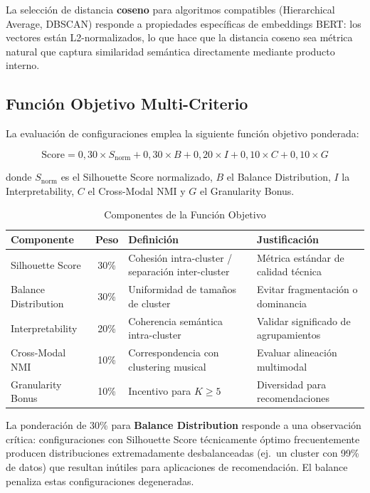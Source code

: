 La selección de distancia \textbf{coseno} para algoritmos compatibles (Hierarchical Average, DBSCAN) responde a propiedades específicas de embeddings BERT: los vectores están L2-normalizados, lo que hace que la distancia coseno sea métrica natural que captura similaridad semántica directamente mediante producto interno.

\subsection{Función Objetivo Multi-Criterio}
\label{subsec:funcion-objetivo}

La evaluación de configuraciones emplea la siguiente función objetivo ponderada:

\begin{equation}
\label{eq:funcion-objetivo}
\text{Score} = 0{,}30 \times S_{\text{norm}} + 0{,}30 \times B + 0{,}20 \times I + 0{,}10 \times C + 0{,}10 \times G
\end{equation}

\noindent donde $S_{\text{norm}}$ es el Silhouette Score normalizado, $B$ el Balance Distribution, $I$ la Interpretability, $C$ el Cross-Modal NMI y $G$ el Granularity Bonus.

\begin{table}[htbp]
\centering
\caption{Componentes de la Función Objetivo}
\label{tab:componentes-objetivo}
\begin{tabular}{lcp{4.5cm}p{4.5cm}}
\toprule
\textbf{Componente} & \textbf{Peso} & \textbf{Definición} & \textbf{Justificación} \\
\midrule
Silhouette Score & 30\% & Cohesión intra-cluster / separación inter-cluster & Métrica estándar de calidad técnica \\
Balance Distribution & 30\% & Uniformidad de tamaños de cluster & Evitar fragmentación o dominancia \\
Interpretability & 20\% & Coherencia semántica intra-cluster & Validar significado de agrupamientos \\
Cross-Modal NMI & 10\% & Correspondencia con clustering musical & Evaluar alineación multimodal \\
Granularity Bonus & 10\% & Incentivo para $K \geq 5$ & Diversidad para recomendaciones \\
\bottomrule
\end{tabular}
\end{table}

La ponderación de 30\% para \textbf{Balance Distribution} responde a una observación crítica: configuraciones con Silhouette Score técnicamente óptimo frecuentemente producen distribuciones extremadamente desbalanceadas (ej.\ un cluster con 99\% de datos) que resultan inútiles para aplicaciones de recomendación. El balance penaliza estas configuraciones degeneradas.

